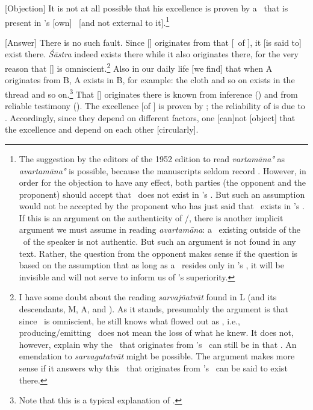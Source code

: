 [Objection] %
It is not at all possible that his excellence is proven by a \sastra\ that is present in \Isvara's [own] \sattva\ [and not external to it].\footnote{The suggestion by the editors of the 1952 edition to read \emph{vartamāna°} as \emph{avartamāna°} is possible, because the manuscripts seldom record \avagraha.  However, in order for the objection to have any effect, both parties (the opponent and the proponent) should accept that \sastra\ does not exist in \Isvara's \sattva.  But such an assumption would not be accepted by the proponent who has just said that \sastra\ exists in \Isvara's \sattva.   If this is an argument on the authenticity of \sabda/\agama, there is another implicit argument we must assume in reading \emph{avartamāna}: a \sastra\ existing outside of the \sattva\ of the speaker is not authentic.  But such an argument is not found in any text.  Rather, the question from the opponent makes sense if the question is based on the assumption that as long as a \sastra\ resides only in \Isvara's \sattva, it will be invisible and will not serve to inform us of \Isvara's superiority.}

[Answer] %
There is no such fault.  Since [\sastra] originates from that [\sattva\ of \Isvara], it [is said to] exist there. \emph{Śāstra\/} indeed exists there while it also originates there, for the very reason that [\Isvara] is omniscient.\footnote{I have some doubt about the reading \emph{sarvajñatvāt} found in L (and its descendants, M, A, and \Me).  As it stands, presumably the argument is that since \Isvara\ is omniscient, he still knows what flowed out as \sastra, i.e., producing/emitting \sastra\ does not mean the loss of what he knew.  It does not, however, explain why the \sastra\ that originates from \Isvara's \sattva\ can still be in that \sattva.  An emendation to \emph{sarvagatatvāt} might be possible.  The argument makes more sense if it answers why this \sastra\ that originates from \Isvara's \sattva\ can be said to exist there.}  Also in our daily life [we find] that when A originates from B, A exists in B, for example: the cloth and so on exists in the thread and so on.\footnote{Note that this is a typical explanation of \satkaryavada.} That [\sastra] originates there is known from inference (\anumana) and from reliable testimony (\agama).  The excellence [of \Isvara] is proven by \sastra; the reliability of \sastra\/ is due to \Isvara.  Accordingly, since they depend on different factors, one [can]not [object] that the excellence and \sastra\/ depend on each other [circularly].

